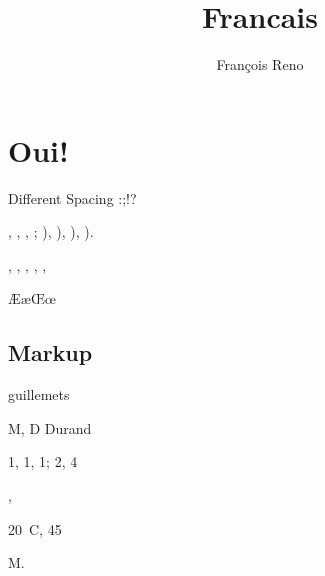 \documentclass{report}
\begin{document}
\title{Francais}
\author{Fran\c{c}ois Reno}
\maketitle
\chapter{Oui!}

Different Spacing :;!?

\No \no


\primo, \secundo, \tertio, \quarto; \fprimo), \fsecundo), \ftertio), \fquarto).

\ieme, \iemes, \ier, \iers, \iere, \ieres


\AE \ae \OE \oe \at \circonflexe \tild \boi \degre

\section{Markup}
\og guillemets \fg{}

M, D Durand

1\ier{}, 1\iere{}, 1\ieres{}; 2\ieme{}, 4\iemes{}

, 

20~\degres C, 45\degres

M. 

\end{document}
